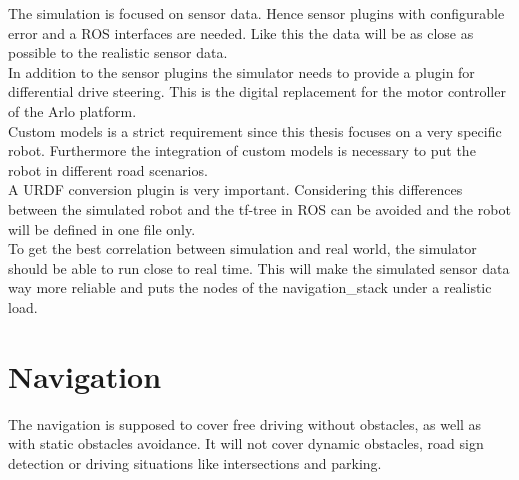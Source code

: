 The simulation is focused on sensor data. Hence sensor plugins with configurable error and a ROS interfaces are needed. Like this the data will be as close as possible to the realistic sensor data.\\

In addition to the sensor plugins the simulator needs to provide a plugin for differential drive steering. This is the digital replacement for the motor controller of the Arlo platform.\\

Custom models is a strict requirement since this thesis focuses on a very specific robot. Furthermore the integration of custom models is necessary to put the robot in different road scenarios.\\

A URDF conversion plugin is very important. Considering this differences between the simulated robot and the tf-tree in ROS can be avoided and the robot will be defined in one file only.\\

To get the best correlation between simulation and real world, the simulator should be able to run close to real time. This will make the simulated sensor data way more reliable and puts the nodes of the navigation\_stack under a realistic load.

\section{Navigation}
The navigation is supposed to cover free driving without obstacles, as well as with static obstacles avoidance. It will not cover dynamic obstacles, road sign detection or driving situations like intersections and parking.\\

